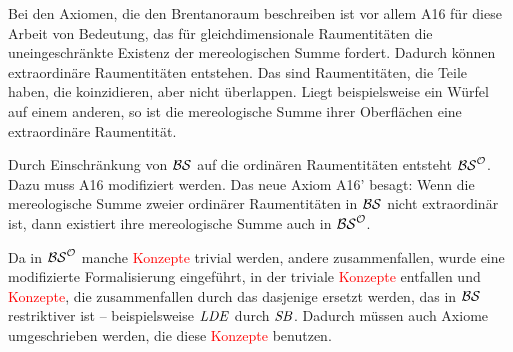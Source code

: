     Bei
    den Axiomen, die den Brentanoraum beschreiben ist vor allem A16 für diese Arbeit von Bedeutung, das für gleichdimensionale Raumentitäten die uneingeschränkte Existenz der mereologischen Summe fordert.
    Dadurch können extraordinäre Raumentitäten entstehen. 
    Das sind Raumentitäten, die Teile haben, die koinzidieren, aber nicht überlappen.
    Liegt beispielsweise ein Würfel auf einem anderen, so ist die mereologische Summe ihrer Oberflächen eine extraordinäre Raumentität.
    
    Durch
    Einschränkung von $\mathcal{BS}$ auf die ordinären Raumentitäten entsteht $\mathcal{BS}^{\mathcal{O}}$.
    Dazu muss A16 modifiziert werden.
    Das neue Axiom A16' besagt: Wenn die mereologische Summe zweier ordinärer Raumentitäten in $\mathcal{BS}$ nicht extraordinär ist, dann existiert ihre mereologische Summe auch in $\mathcal{BS}^{\mathcal{O}}$.
    
    Da
    in $\mathcal{BS}^{\mathcal{O}}$ manche \textcolor{red}{Konzepte} trivial werden, andere zusammenfallen, wurde eine modifizierte Formalisierung eingeführt, in der triviale \textcolor{red}{Konzepte} entfallen und \textcolor{red}{Konzepte}, die zusammenfallen durch das dasjenige ersetzt werden, das in $\mathcal{BS}$ restriktiver ist -- beispielsweise $\mathit{LDE}$ durch $\mathit{S\hspace*{-0.25ex}B}$. 
    Dadurch müssen auch Axiome umgeschrieben werden, die diese \textcolor{red}{Konzepte} benutzen.
    
